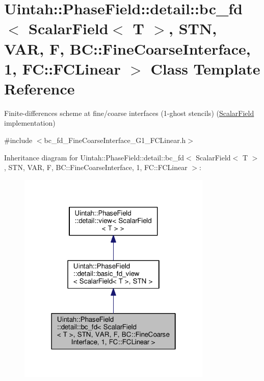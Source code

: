\hypertarget{classUintah_1_1PhaseField_1_1detail_1_1bc__fd_3_01ScalarField_3_01T_01_4_00_01STN_00_01VAR_00_01f836207db876ecd28bf65f631f79030f}{}\section{Uintah\+:\+:Phase\+Field\+:\+:detail\+:\+:bc\+\_\+fd$<$ Scalar\+Field$<$ T $>$, S\+TN, V\+AR, F, BC\+:\+:Fine\+Coarse\+Interface, 1, FC\+:\+:F\+C\+Linear $>$ Class Template Reference}
\label{classUintah_1_1PhaseField_1_1detail_1_1bc__fd_3_01ScalarField_3_01T_01_4_00_01STN_00_01VAR_00_01f836207db876ecd28bf65f631f79030f}


Finite-\/differences scheme at fine/coarse interfaces (1-\/ghost stencils) (\hyperlink{structUintah_1_1PhaseField_1_1ScalarField}{Scalar\+Field} implementation)  




{\ttfamily \#include $<$bc\+\_\+fd\+\_\+\+Fine\+Coarse\+Interface\+\_\+\+G1\+\_\+\+F\+C\+Linear.\+h$>$}



Inheritance diagram for Uintah\+:\+:Phase\+Field\+:\+:detail\+:\+:bc\+\_\+fd$<$ Scalar\+Field$<$ T $>$, S\+TN, V\+AR, F, BC\+:\+:Fine\+Coarse\+Interface, 1, FC\+:\+:F\+C\+Linear $>$\+:\nopagebreak
\begin{figure}[H]
\begin{center}
\leavevmode
\includegraphics[width=262pt]{classUintah_1_1PhaseField_1_1detail_1_1bc__fd_3_01ScalarField_3_01T_01_4_00_01STN_00_01VAR_00_01ec1c1ffce337f28b654f800f5c34ba8c}
\end{center}
\end{figure}


